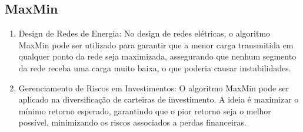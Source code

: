\documentclass[12pt]{article}
\begin{document}
\subsection{MaxMin}
\begin{enumerate}
    \item Design de Redes de Energia: No design de redes elétricas, o algoritmo MaxMin pode ser utilizado para garantir que a menor carga transmitida em qualquer ponto da rede seja maximizada, assegurando que nenhum segmento da rede receba uma carga muito baixa, o que poderia causar instabilidades.
    \item Gerenciamento de Riscos em Investimentos: O algoritmo MaxMin pode ser aplicado na diversificação de carteiras de investimento. A ideia é maximizar o mínimo retorno esperado, garantindo que o pior retorno seja o melhor possível, minimizando os riscos associados a perdas financeiras.
\end{enumerate}
\end{document}
